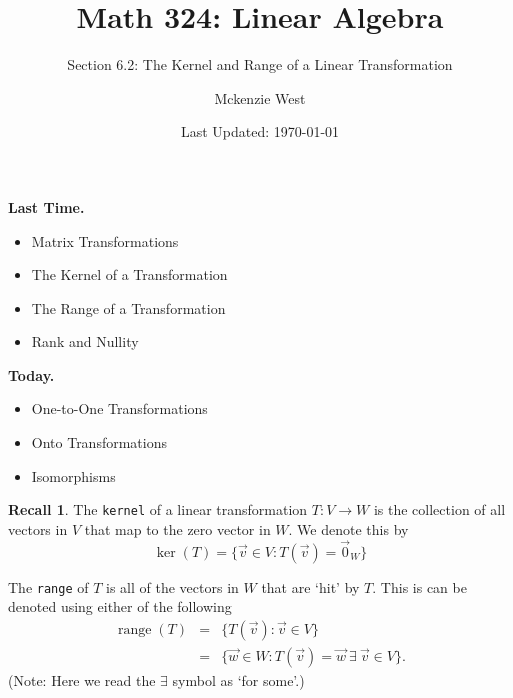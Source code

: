 \documentclass{beamer}
\newcommand{\fn}{\insertframenumber}
\theoremstyle{definition}
\newtheorem*{recall}{Recall}
\renewcommand{\emph}[1]{{\color{blue}\texttt{#1}}}
\begin{document}
	\title{Math 324: Linear Algebra}
	\subtitle{Section 6.2: The Kernel and Range of a Linear Transformation}
	\author{Mckenzie West}
	\date{Last Updated: \today}
\begin{frame}[fragile]
\maketitle	
\end{frame}

\begin{frame}{\insertframenumber}
	\begin{block}{\textbf{Last Time.}}
	\begin{itemize}[label=--]
		\item Matrix Transformations
		\item The Kernel of a Transformation
		\item The Range of a Transformation
		\item Rank and Nullity
	\end{itemize}
	\end{block}
	\begin{block}{\textbf{Today.}}
		\begin{itemize}[label=--]
			\item One-to-One Transformations
			\item Onto Transformations
			\item Isomorphisms
		\end{itemize}
	\end{block}
\end{frame}
\begin{frame}{\fn}
	\begin{recall}
			The \emph{kernel} of a linear transformation $T\colon V\to W$ is the collection of all vectors in $V$ that map to the zero vector in $W$.  We denote this by	\[\ker(T)=\{\vec v\in V:T(\vec v)=\vec 0_W\}\]
			
			The \emph{range} of $T$ is all of the vectors in $W$ that are `hit' by $T$.  This is can be denoted using either of the following
				\begin{eqnarray*}
				\operatorname{range}(T)&=&\{T(\vec v):\vec v\in V\}\\
				&=&\{\vec w\in W:T(\vec v)=\vec w\ \exists\  \vec v\in V\}.
				\end{eqnarray*}
			(Note: Here we read the $\exists$ symbol as `for some'.)
	\end{recall}
\end{frame}
\end{document}
